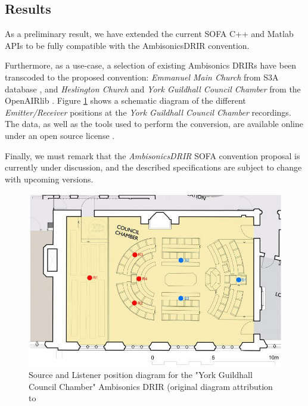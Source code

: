 \subsection{Results}  

As a preliminary result, we have extended the current SOFA C++  \cite{sofacpp} and Matlab \cite{sofamo} APIs to be fully compatible with the AmbisonicsDRIR convention. 

Furthermore, as a use-case, a selection of existing Ambisonics DRIRs have been transcoded to the proposed convention: \textit{Emmanuel Main Church} from S3A database \cite{coleman2015s3a}, and \textit{Heslington Church} and \textit{York Guildhall Council Chamber} from the OpenAIRlib \cite{openair}. Figure \ref{guildhall} shows a schematic diagram of the different \textit{Emitter/Receiver} positions at the \textit{York Guildhall Council Chamber} recordings. The data, as well as the tools used to perform the conversion, are available online under an open source license \cite{ambisonicsdrirexamples}.

Finally, we must remark that the \textit{AmbisonicsDRIR} SOFA convention proposal is currently under discussion, and the described specifications are subject to change with upcoming versions. 


\begin{figure}
	\centering
	\includegraphics[width=\textwidth]{Figures/DataGeneration/guildhall}
	\caption{Source and Listener position diagram for the "York Guildhall Council Chamber" Ambisonics DRIR (original diagram attribution to \cite{guildhall} }
	\label{guildhall}
\end{figure}

